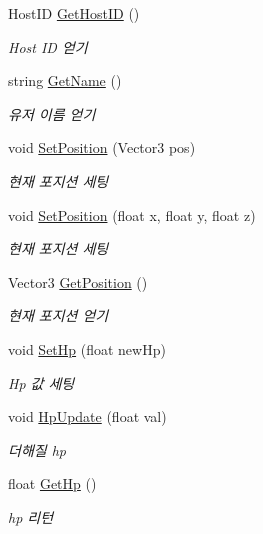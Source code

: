 \begin{DoxyCompactItemize}
Host\+ID \hyperlink{class_room_client_abd9ca9b40211167cd5c995a628cb7c23}{Get\+Host\+ID} ()
\begin{DoxyCompactList}\small\item\em Host ID 얻기 \end{DoxyCompactList}\item 
string \hyperlink{class_room_client_ac7e064c639bf2bf2f2d5fdfceb75645b}{Get\+Name} ()
\begin{DoxyCompactList}\small\item\em 유저 이름 얻기 \end{DoxyCompactList}\item 
void \hyperlink{class_room_client_a0f21c1dbda294ebe79195248c5d32dc6}{Set\+Position} (Vector3 pos)
\begin{DoxyCompactList}\small\item\em 현재 포지션 세팅 \end{DoxyCompactList}\item 
void \hyperlink{class_room_client_a4b76c74d4c9fdaaac4f876f6d35a8bfb}{Set\+Position} (float x, float y, float z)
\begin{DoxyCompactList}\small\item\em 현재 포지션 세팅 \end{DoxyCompactList}\item 
Vector3 \hyperlink{class_room_client_a3016a1d1ab8ec0976c11e85c4c7312e5}{Get\+Position} ()
\begin{DoxyCompactList}\small\item\em 현재 포지션 얻기 \end{DoxyCompactList}\item 
void \hyperlink{class_room_client_ade76f054278add2b12575b82802402c7}{Set\+Hp} (float new\+Hp)
\begin{DoxyCompactList}\small\item\em Hp 값 세팅 \end{DoxyCompactList}\item 
void \hyperlink{class_room_client_a18c7c0229d3c71c755b33a57b804b996}{Hp\+Update} (float val)
\begin{DoxyCompactList}\small\item\em 더해질 hp \end{DoxyCompactList}\item 
float \hyperlink{class_room_client_a5f65e0e924f26ebbc6f14721655a0af4}{Get\+Hp} ()
\begin{DoxyCompactList}\small\item\em hp 리턴 \end{DoxyCompactList}\item 

\end{DoxyCompactItemize}

